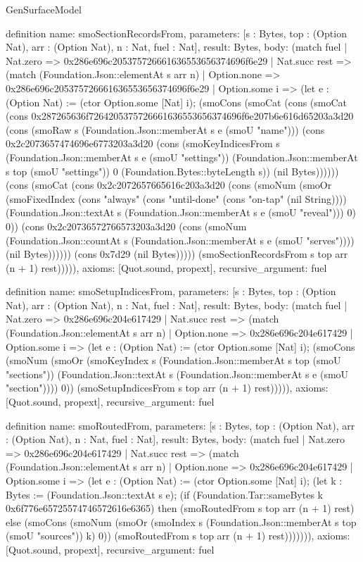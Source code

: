 \begin{lexlean}{GenSurfaceModel}
\begin{semanticmodule}
definition{
  name: smoSectionRecordsFrom,
  parameters: [s : Bytes, top : (Option Nat), arr : (Option Nat), n : Nat, fuel : Nat],
  result: Bytes,
  body: (match fuel
    | Nat.zero => 0x286e696c205375726661636553656374696f6e29
    | Nat.succ rest => (match (Foundation.Json::elementAt s arr n)
      | Option.none => 0x286e696c205375726661636553656374696f6e29
      | Option.some i => (let e : (Option Nat) := (ctor Option.some [Nat] i); (smoCons (smoCat (cons (smoCat (cons 0x287265636f7264205375726661636553656374696f6e207b6e616d65203a3d20 (cons (smoRaw s (Foundation.Json::memberAt s e (smoU "name"))) (cons 0x2c2073657474696e6773203a3d20 (cons (smoKeyIndicesFrom s (Foundation.Json::memberAt s e (smoU "settings")) (Foundation.Json::memberAt s top (smoU "settings")) 0 (Foundation.Bytes::byteLength s)) (nil Bytes)))))) (cons (smoCat (cons 0x2c2072657665616c203a3d20 (cons (smoNum (smoOr (smoFixedIndex (cons "always" (cons "until-done" (cons "on-tap" (nil String)))) (Foundation.Json::textAt s (Foundation.Json::memberAt s e (smoU "reveal"))) 0) 0)) (cons 0x2c20736572766573203a3d20 (cons (smoNum (Foundation.Json::countAt s (Foundation.Json::memberAt s e (smoU "serves")))) (nil Bytes)))))) (cons 0x7d29 (nil Bytes))))) (smoSectionRecordsFrom s top arr (n + 1) rest))))),
  axioms: [Quot.sound, propext],
  recursive_argument: fuel
}

definition{
  name: smoSetupIndicesFrom,
  parameters: [s : Bytes, top : (Option Nat), arr : (Option Nat), n : Nat, fuel : Nat],
  result: Bytes,
  body: (match fuel
    | Nat.zero => 0x286e696c204e617429
    | Nat.succ rest => (match (Foundation.Json::elementAt s arr n)
      | Option.none => 0x286e696c204e617429
      | Option.some i => (let e : (Option Nat) := (ctor Option.some [Nat] i); (smoCons (smoNum (smoOr (smoKeyIndex s (Foundation.Json::memberAt s top (smoU "sections")) (Foundation.Json::textAt s (Foundation.Json::memberAt s e (smoU "section")))) 0)) (smoSetupIndicesFrom s top arr (n + 1) rest))))),
  axioms: [Quot.sound, propext],
  recursive_argument: fuel
}

definition{
  name: smoRoutedFrom,
  parameters: [s : Bytes, top : (Option Nat), arr : (Option Nat), n : Nat, fuel : Nat],
  result: Bytes,
  body: (match fuel
    | Nat.zero => 0x286e696c204e617429
    | Nat.succ rest => (match (Foundation.Json::elementAt s arr n)
      | Option.none => 0x286e696c204e617429
      | Option.some i => (let e : (Option Nat) := (ctor Option.some [Nat] i); (let k : Bytes := (Foundation.Json::textAt s e); (if (Foundation.Tar::sameBytes k 0x6f776e65725574746572616e6365) then (smoRoutedFrom s top arr (n + 1) rest) else (smoCons (smoNum (smoOr (smoIndex s (Foundation.Json::memberAt s top (smoU "sources")) k) 0)) (smoRoutedFrom s top arr (n + 1) rest))))))),
  axioms: [Quot.sound, propext],
  recursive_argument: fuel
}


\end{semanticmodule}
\end{lexlean}
